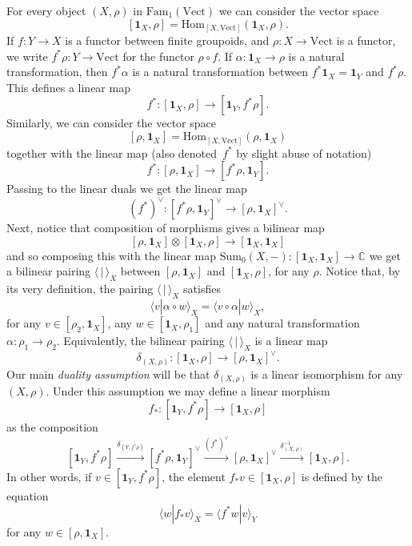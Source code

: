 \documentclass[12pt]{scrartcl}
\theoremstyle{definition}
\numberwithin{equation}{section}
\numberwithin{definition}{section}
\numberwithin{figure}{section}
\begin{document}
For every object $(X,\rho)$ in $\mathrm{Fam}_1(\mathrm{Vect})$ we can consider the vector space 
\[
[\mathbf{1}_X,\rho]=\mathrm{Hom}_{[X,\mathrm{Vect}]}(\mathbf{1}_X,\rho).
\]
If $f\colon Y\to X$ is a functor between finite groupoids, and $\rho\colon X\to \mathrm{Vect}$ is a functor, we write $f^*\rho\colon Y\to \mathrm{Vect}$ for the functor $\rho\circ f$. If $\alpha\colon \mathbf{1}_X\to \rho$ is a natural transformation, then $f^*\alpha$ is a natural transformation between $f^*\mathbf{1}_X=\mathbf{1}_Y$ and $f^*\rho$. This defines a linear map
\[
f^* \colon [\mathbf{1}_X,\rho] \to [\mathbf{1}_Y, f^*\rho].
\]
Similarly, we can consider the vector space
\[
[\rho,\mathbf{1}_X]=\mathrm{Hom}_{[X,\mathrm{Vect}]}(\rho, \mathbf{1}_X)
\]
together with the linear map (also denoted~$f^*$ by slight abuse of notation) 
\[
f^* \colon [\rho,\mathbf{1}_X] \to [f^*\rho,\mathbf{1}_Y].
\]
Passing to the linear duals we get the linear map
\[
(f^*)^\vee\colon [f^*\rho,\mathbf{1}_Y]^\vee \to [\rho,\mathbf{1}_X]^\vee.
\]
Next, notice that composition of morphisms gives a bilinear map
\[
[\rho,\mathbf{1}_X]\otimes [\mathbf{1}_X,\rho] \to [\mathbf{1}_X,\mathbf{1}_X]
\]
and so composing this with the linear map $\mathrm{Sum}_0(X,-)\colon [\mathbf{1}_X,\mathbf{1}_X]\to \mathbb{C}$ we get a bilinear pairing $\langle\,|\,\rangle_X$ between $[\rho,\mathbf{1}_X]$ and $[\mathbf{1}_X,\rho]$, for any $\rho$. Notice that, by its very definition, the pairing $\langle\,|\,\rangle_X$ satisfies
\[
\langle v|\alpha\circ w\rangle_X =\langle  v\circ \alpha|w \rangle_X,
\]
for any $v\in [\rho_2,\mathbf{1}_X]$, any $w\in [\mathbf{1}_X,\rho_1]$ and any natural transformation $\alpha\colon \rho_1\to \rho_2$.
Equivalently, the bilinear pairing $\langle\,|\,\rangle_X$ is a linear map
\[
\delta_{(X,\rho)}\colon [\mathbf{1}_X,\rho]\to [\rho,\mathbf{1}_X]^\vee.
\]
Our main \emph{duality assumption} will be that $\delta_{(X,\rho)}$ is a linear isomorphism for any $(X,\rho)$. Under this assumption we may define a linear morphism 
\[
f_*\colon [\mathbf{1}_Y,f^*\rho]\to  [\mathbf{1}_X,\rho]
\]
as the composition
\[
[\mathbf{1}_Y,f^*\rho]\xrightarrow{\delta_{(Y,f^*\rho)}}[f^*\rho,\mathbf{1}_Y]^\vee \xrightarrow{(f^*)^\vee} [\rho,\mathbf{1}_X]^\vee \xrightarrow{\delta_{(X,\rho)}^{-1}} [\mathbf{1}_X,\rho].
\]
In other words, if $v\in [\mathbf{1}_Y,f^*\rho]$, the element $f_*v\in [\mathbf{1}_X,\rho]$ is defined 
 by the equation
\[
\langle w| f_*v\rangle_X = \langle f^*w| v\rangle_Y
\]
for any $w\in [\rho,\mathbf{1}_X]$. 
\end{document}
